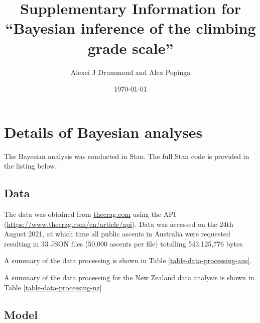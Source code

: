 \documentclass[11pt]{article}
\begin{document}
\title{Supplementary Information for ``Bayesian inference of the climbing grade scale''}
\author{Alexei J Drummond and Alex Popinga}
\date{\today}
\maketitle

\section{Details of Bayesian analyses}

The Bayesian analysis was conducted in Stan. The full Stan code is provided in the listing below.

\subsection{Data}

The data was obtained from \url{thecrag.com} using the API (\url{https://www.thecrag.com/en/article/api}). Data was accessed on the 24th August 2021, at which time all public ascents in Australia were requested resulting in 33 JSON files (50,000 ascents per file) totalling 543,125,776 bytes.

A summary of the data processing is shown in Table \ref{table-data-processing-aus}.



A summary of the data processing for the New Zealand data analysis is shown in Table \ref{table-data-processing-nz}



\subsection{Model}
\end{document}
